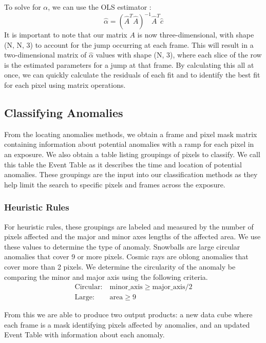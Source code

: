 To solve for $\alpha$, we can use the OLS estimator \parencite{puntanen1989equality}:
\begin{equation}
    \hat{\alpha} = (\hat{A}^T \hat{A})^{-1} \hat{A}^T \hat{c}
\end{equation}
It is important to note that our matrix $A$ is now three-dimensional, with shape (N, N, 3) to account for the jump occurring at each frame.
This will result in a two-dimensional matrix of $\hat{\alpha}$ values with shape (N, 3), where each slice of the row is the estimated parameters for a jump at that frame.
By calculating this all at once, we can quickly calculate the residuals of each fit and to identify the best fit for each pixel using matrix operations.

\subsection{Classifying Anomalies}
From the locating anomalies methods, we obtain a frame and pixel mask matrix containing information about potential anomalies with a ramp for each pixel in an exposure. 
We also obtain a table listing groupings of pixels to classify. We call this table the Event Table as it describes the time and location of potential anomalies. 
These groupings are the input into our classification methods as they help limit the search to specific pixels and frames across the exposure. 

\subsubsection{Heuristic Rules}
For heuristic rules, these groupings are labeled and measured by the number of pixels affected and the major and minor axes lengths of the affected area. 
We use these values to determine the type of anomaly.
Snowballs are large circular anomalies that cover 9 or more pixels.
Cosmic rays are oblong anomalies that cover more than 2 pixels. 
We determine the circularity of the anomaly be comparing the minor and major axis using the following criteria.
\begin{align*}
    \text{Circular:}\ &  \text{minor\_axis} \geq \text{major\_axis}/2 \\
    \text{Large:}\ & \text{area} \geq 9
\end{align*}

From this we are able to produce two output products: a new data cube where each frame is a mask identifying pixels affected by anomalies, and an updated Event Table with information about each anomaly. 


